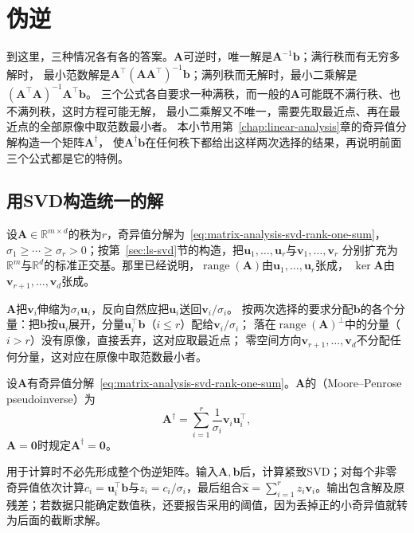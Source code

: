\section{伪逆}
\label{sec:ls-pseudoinverse}

到这里，三种情况各有各的答案。$\bm A$可逆时，唯一解是$\bm A^{-1}\bm b$；满行秩而有无穷多解时，
最小范数解是$\bm A^\top(\bm A\bm A^\top)^{-1}\bm b$；满列秩而无解时，最小二乘解是$(\bm A^\top\bm A)^{-1}\bm A^\top\bm b$。
三个公式各自要求一种满秩，而一般的$\bm A$可能既不满行秩、也不满列秩，这时方程可能无解，
最小二乘解又不唯一，需要先取最近点、再在最近点的全部原像中取范数最小者。
本小节用第~\ref{chap:linear-analysis}章的奇异值分解构造一个矩阵$\bm A^\dagger$，
使$\bm A^\dagger\bm b$在任何秩下都给出这样两次选择的结果，再说明前面三个公式都是它的特例。

\subsection{用SVD构造统一的解}

设$\bm A\in\mathbb R^{m\times d}$的秩为$r$，奇异值分解为~\eqref{eq:matrix-analysis-svd-rank-one-sum}，
$\sigma_1\geq\cdots\geq\sigma_r>0$；按第~\ref{sec:ls-svd}节的构造，把$\bm u_1,\ldots,\bm u_r$与$\bm v_1,\ldots,\bm v_r$
分别扩充为$\mathbb R^m$与$\mathbb R^d$的标准正交基。那里已经说明，$\operatorname{range}(\bm A)$由$\bm u_1,\ldots,\bm u_r$张成，
$\ker\bm A$由$\bm v_{r+1},\ldots,\bm v_d$张成。

$\bm A$把$\bm v_i$伸缩为$\sigma_i\bm u_i$，反向自然应把$\bm u_i$送回$\bm v_i/\sigma_i$。
按两次选择的要求分配$\bm b$的各个分量：把$\bm b$按$\bm u_i$展开，分量$\bm u_i^\top\bm b$（$i\leq r$）配给$\bm v_i/\sigma_i$；
落在$\operatorname{range}(\bm A)^\perp$中的分量（$i>r$）没有原像，直接丢弃，这对应取最近点；
零空间方向$\bm v_{r+1},\ldots,\bm v_d$不分配任何分量，这对应在原像中取范数最小者。

\begin{definition}
\label{def:matrix-analysis-pseudoinverse}
设$\bm A$有奇异值分解~\eqref{eq:matrix-analysis-svd-rank-one-sum}。$\bm A$的（Moore--Penrose pseudoinverse）为
\begin{equation}
 \bm A^\dagger=\sum_{i=1}^r\frac{1}{\sigma_i}\bm v_i\bm u_i^\top,
 \label{eq:matrix-analysis-pseudoinverse}
\end{equation}
$\bm A=\bm0$时规定$\bm A^\dagger=\bm0$。
\end{definition}

用于计算时不必先形成整个伪逆矩阵。输入$\bm A,\bm b$后，计算紧致SVD；对每个非零奇异值依次计算$c_i=\bm u_i^\top\bm b$与$z_i=c_i/\sigma_i$，最后组合$\hat{\bm x}=\sum_{i=1}^r z_i\bm v_i$。输出包含解及原残差；若数据只能确定数值秩，还要报告采用的阈值，因为丢掉正的小奇异值就转为后面的截断求解。

